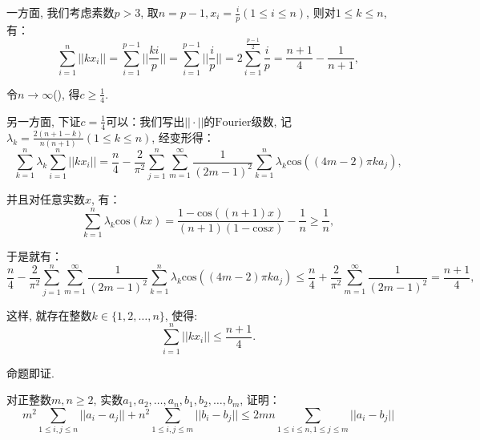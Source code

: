 \documentclass[lang=cn,12pt,thmcnt=section]{elegantbook}
\renewcommand{\note}[1]{({\kaishu\dashuline{#1}})}
\begin{document}
\begin{solution}
一方面, 我们考虑素数$p>3$, 取$n=p-1,x_i=\frac{i}{p}(1\le i\le n)$, 则对$1\le k\le n$, 有：
\[
\sum_{i=1}^n||kx_i||=\sum_{i=1}^{p-1}||\frac{ki}{p}||=\sum_{i=1}^{p-1}||\frac{i}{p}||=2\sum_{i=1}^{\frac{p-1}{2}}\frac{i}{p}=\frac{n+1}{4}-\frac{1}{n+1},
\]

令$n\to \infty$\note{这里用到素数有无穷多个}, 得$c\ge \frac{1}{4}$.

另一方面, 下证$c=\frac{1}{4}$可以：我们写出$||\cdot||$的$\mathrm{Fourier}$级数, 记$\lambda_k=\frac{2(n+1-k)}{n(n+1)}(1\le k\le n)$, 经变形得：
\[
\sum_{k=1}^n \lambda_k\sum_{i=1}^n||kx_i||=\frac{n}{4}-\frac{2}{\pi^2}\sum_{j=1}^n\sum_{m=1}^\infty \frac{1}{(2m-1)^2}\sum_{k=1}^n \lambda_k\mathrm{cos}((4m-2)\pi ka_j),
\]

并且对任意实数$x$, 有：
\[
\sum_{k=1}^n \lambda_k\mathrm{cos}(kx)=\frac{1-\mathrm{cos}((n+1)x)}{(n+1)(1-\mathrm{cos}x)}-\frac{1}{n}\ge \frac{1}{n},
\]

于是就有：
\[
\frac{n}{4}-\frac{2}{\pi^2}\sum_{j=1}^n\sum_{m=1}^\infty \frac{1}{(2m-1)^2}\sum_{k=1}^n \lambda_k\mathrm{cos}((4m-2)\pi ka_j)\le \frac{n}{4}+\frac{2}{\pi^2}\sum_{m=1}^\infty \frac{1}{(2m-1)^2}=\frac{n+1}{4},
\]

这样, 就存在整数$k\in\{1,2,\dots{},n\}$, 使得:
\[
\sum_{i=1}^n||kx_i||\le \frac{n+1}{4}. 
\]

命题即证.
\end{solution}

\begin{example}
对正整数$m,n\ge 2$, 实数$a_1,a_2,\dots{},a_n,b_1,b_2,\dots{},b_m$, 证明：
\[
m^2\sum_{1\le i,j\le n}||a_i-a_j||+n^2\sum_{1\le i,j\le m}||b_i-b_j||\le 2mn\sum_{1\le i\le n,1\le j\le m}||a_i-b_j||
\]
\end{example}
\end{document}
